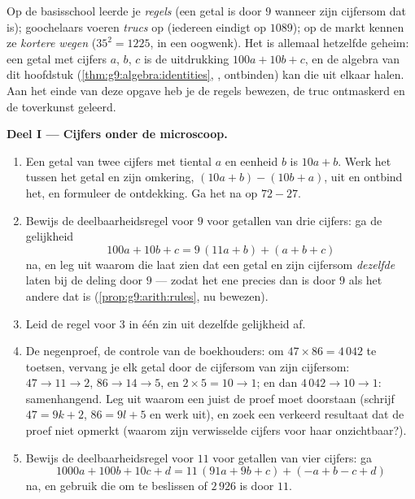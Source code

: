 \begin{problem}
\label{pb:g9:algebra:1}
Op de basisschool leerde je \emph{regels} (een getal is  door $9$ wanneer
zijn cijfersom dat is); goochelaars voeren \emph{trucs} op (iedereen eindigt op
$1089$); op de markt kennen ze \emph{kortere wegen} ($35^2 = 1225$, in een
oogwenk). Het is allemaal hetzelfde geheim: een getal met cijfers $a$, $b$, $c$ is
de uitdrukking $100a + 10b + c$, en de algebra van dit hoofdstuk
(\cref{thm:g9:algebra:identities}, , ontbinden) kan die uit elkaar halen.
Aan het einde van deze opgave heb je de regels bewezen, de truc ontmaskerd en de
toverkunst geleerd.

\medskip
\noindent\textbf{Deel I --- Cijfers onder de microscoop.}
\begin{enumerate}
  \item Een getal van twee cijfers met tiental $a$ en eenheid $b$ is $10a + b$.
        Werk het  tussen het getal en zijn omkering,
        $(10a + b) - (10b + a)$, uit en ontbind het, en formuleer de ontdekking. Ga
        het na op $72 - 27$.
  \item Bewijs de deelbaarheidsregel voor $9$ voor getallen van drie cijfers: ga
        de gelijkheid
        \[
        100a + 10b + c = 9\,(11a + b) + (a + b + c)
        \]
        na, en leg uit waarom die laat zien dat een getal en zijn cijfersom
        \emph{dezelfde } laten bij de deling door $9$ --- zodat het ene precies
        dan  is door $9$ als het andere dat is
        (\cref{prop:g9:arith:rules}, nu bewezen).
  \item Leid de regel voor $3$ in één zin uit dezelfde gelijkheid af.
  \item De negenproef, de controle van de boekhouders: om
        $47 \times 86 = 4\,042$ te toetsen, vervang je elk getal door de cijfersom
        van zijn cijfersom: $47 \to 11 \to 2$, $86 \to 14 \to 5$, en
        $2 \times 5 = 10 \to 1$; en dan $4\,042 \to 10 \to 1$: samenhangend. Leg
        uit waarom een juist  de proef moet doorstaan (schrijf
        $47 = 9k + 2$, $86 = 9l + 5$ en werk uit), en zoek een verkeerd resultaat
        dat de proef niet opmerkt (waarom zijn verwisselde cijfers voor haar
        onzichtbaar?).
  \item Bewijs de deelbaarheidsregel voor $11$ voor getallen van vier cijfers: ga
        \[
        1000a + 100b + 10c + d
        = 11\,(91a + 9b + c) + (- a + b - c + d)
        \]
        na, en gebruik die om te beslissen of $2\,926$  is door $11$.
\end{enumerate}


\end{problem}

